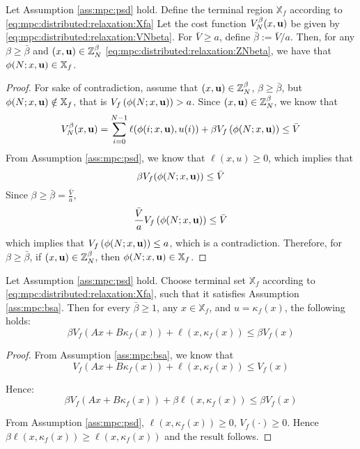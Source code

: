 \begin{proposition}
\label{prop:mpc:distributed:relaxation:betabar}
Let Assumption \ref{ass:mpc:psd} hold. Define the terminal region $\mathbb{X}_f$
according to \eqref{eq:mpc:distributed:relaxation:Xfa}
Let the cost function  $V_N^\beta(x,\mathbf{u})$ be given by 
\eqref{eq:mpc:distributed:relaxation:VNbeta}. For  $\bar{V} 
\geq a $, define $\bar{\beta} := \bar{V}/a$. Then, for any $\beta \geq
\bar{\beta}$ and $(x,\mathbf{u}) \in \mathbb{Z}_N^\beta$ \eqref{eq:mpc:distributed:relaxation:ZNbeta}, we have
that $\phi(N;x,\mathbf{u}) \in \mathbb{X}_f$.
\begin{proof}
For sake of contradiction, assume that $(x,\mathbf{u}) \in
\mathbb{Z}_N^\beta$, $\beta \geq \bar{\beta}$, but $\phi(N;x,\mathbf{u})
\notin \mathbb{X}_f$, that is $V_f\left(\phi(N;x,\mathbf{u})\right)>a$. Since
$(x,\mathbf{u}) \in \mathbb{Z}_N^\beta$, we know  that
\[V_N^{\beta}(x,\mathbf{u}) 
= \sum_{i=0}^{N-1} \ell(\phi(i;x,\mathbf{u}),u(i)) + \beta
V_f\left(\phi(N;x,\mathbf{u})\right) \leq \bar{V}\] 
From Assumption \ref{ass:mpc:psd}, we know that
$\ell(x,u) \geq 0$, which implies that
\[\beta V_f(\phi(N;x,\mathbf{u})) \leq \bar{V} \]
Since $\beta \geq \bar{\beta} = \frac{\bar{V}}{a}$,
\[\frac{\bar{V}}{a} V_f\left(\phi(N;x,\mathbf{u})\right) \leq \bar{V}\]
which implies that $V_f\left(\phi(N;x,\mathbf{u})\right) \leq a$, 
which is a contradiction. Therefore, for $\beta \geq \bar{\beta}$, if
$(x,\mathbf{u}) \in \mathbb{Z}_N^{\beta}$, then $\phi(N;x,\mathbf{u}) \in
\mathbb{X}_f$.

\end{proof}
\end{proposition}


\begin{proposition}
\label{prop:mpc:distributed:relaxation:cost-drop}
Let Assumption \ref{ass:mpc:psd} hold. Choose terminal set $\mathbb{X}_f$ according to
\ref{eq:mpc:distributed:relaxation:Xfa}, such that it satisfies
Assumption \ref{ass:mpc:bsa}. Then for every $\bar{\beta} \geq 1$, any $x \in \mathbb{X}_f$, and 
$u = \kappa_f(x)$, the following holds:
\[ \beta V_f(Ax+B\kappa_f(x)) + \ell(x,\kappa_f(x)) \leq \beta
V_f(x) \]
\begin{proof}
From Assumption \ref{ass:mpc:bsa}, we know that 
\[ V_f(Ax+B\kappa_f(x)) + \ell(x,\kappa_f(x)) \leq V_f(x) \]

Hence:
\[ \beta V_f(Ax+B\kappa_f(x)) +\beta \ell(x,\kappa_f(x)) \leq \beta V_f(x) \]

From Assumption \ref{ass:mpc:psd}, $\ell(x,\kappa_f(x)) \geq 0$,
$V_f(\cdot) \geq 0$. Hence
$\beta \ell(x,\kappa_f(x)) \geq \ell(x,\kappa_f(x))$ and the result follows.
\end{proof}
\end{proposition}

